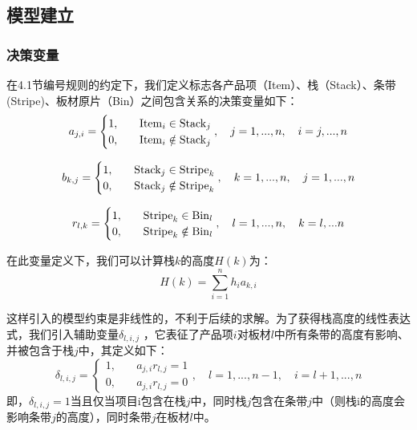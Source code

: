 \documentclass[bwprint]{gmcmthesis}
\begin{document}
\subsection{模型建立}

\subsubsection{决策变量}
在4.1节编号规则的约定下，我们定义标志各产品项（Item）、栈（Stack）、条带(Stripe)、板材原片（Bin）之间包含关系的决策变量如下：
\begin{equation}   %
    a_{j,i}=
    \begin{cases}
        1, \quad  &  {\rm Item}_i \in   {\rm Stack}_j \\
        0,\quad  &  {\rm Item}_i  \notin   {\rm Stack}_j \\
    \end{cases},\quad j=1,...,n, \quad i=j,...,n  \label{决策变量定义a}
\end{equation}

\begin{equation}
    b_{k,j}=
    \begin{cases}
        1, \quad  &  {\rm Stack}_j \in   {\rm Stripe}_k \\
        0,\quad  &  {\rm Stack}_j  \notin   {\rm Stripe}_k \\
    \end{cases},\quad k=1,...,n, \quad j=1,...,n \label{决策变量定义b}
\end{equation}

\begin{equation}
    r_{l,k}=
    \begin{cases}
        1, \quad  &  {\rm Stripe}_k \in   {\rm Bin}_l \\
        0,\quad  &  {\rm Stripe}_k  \notin   {\rm Bin}_l \\
    \end{cases},\quad l=1,...,n, \quad k=l,...n \label{决策变量定义r}
\end{equation}

在此变量定义下，我们可以计算栈$k$的高度$H(k)$为：
\begin{equation}
    H(k)=\sum_{i=1}^{n} h_i a_{k,i}
\end{equation}


这样引入的模型约束是非线性的，不利于后续的求解。为了获得栈高度的线性表达式，我们引入辅助变量$\delta_{l,i,j}$ ，它表征了产品项$i$对板材$l$中所有条带的高度有影响、并被包含于栈$j$中，其定义如下：
\begin{equation}
    \delta_{l,i,j}=  
    \begin{cases}
        1, \quad  & a_{j,i} r_{l,j}=1\\
        0, \quad  & a_{j,i} r_{l,j}=0
    \end{cases},\quad l=1,...,n-1, \quad i=l+1,...,n
\end{equation}
即，$\delta_{l,i,j} = 1$当且仅当项目i包含在栈$j$中，同时栈$j$包含在条带$j$中（则栈i的高度会影响条带$j$的高度），同时条带$j$在板材$l$中。
\end{document}

